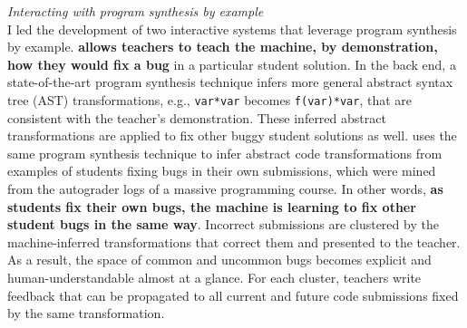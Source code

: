 \documentclass[justified]{tufte-handout}
\begin{document}

\noindent
\emph{Interacting with program synthesis by example}\\
I led the development of two interactive systems that leverage program synthesis by example.\cite{lats17}  \textbf{allows teachers to teach the machine, by demonstration, how they would fix a bug} in a particular student solution. In the back end, a state-of-the-art program synthesis technique infers more general abstract syntax tree (AST) transformations, e.g., \texttt{var*var} becomes \texttt{f(var)*var}, that are consistent with the teacher's demonstration.\cite{refazer} These inferred abstract transformations are applied to fix other buggy student solutions as well.  uses the same program synthesis technique to infer abstract code transformations from examples of students fixing bugs in their own submissions, which were mined from the autograder logs of a massive programming course. In other words, \textbf{as students fix their own bugs, the machine is learning to fix other student bugs in the same way}. Incorrect submissions are clustered by the machine-inferred transformations that correct them and presented to the teacher. As a result, the space of common and uncommon bugs becomes explicit and human-understandable almost at a glance. For each cluster, teachers write feedback that can be propagated to all current and future code submissions fixed by the same transformation. 


\end{document}
